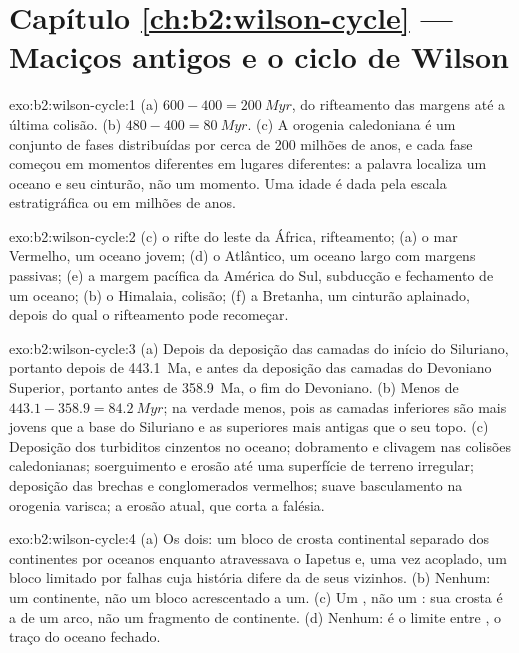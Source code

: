 \section*{Capítulo \ref{ch:b2:wilson-cycle} --- Maciços antigos e o ciclo de Wilson}

\begin{solution}{exo:b2:wilson-cycle:1}
(a) $600 - 400 = \qty{200}{Myr}$, do rifteamento das margens até a última colisão.
(b) $480 - 400 = \qty{80}{Myr}$. (c) A orogenia caledoniana é um conjunto de fases distribuídas por
cerca de 200 milhões de anos, e cada fase começou em momentos diferentes em lugares diferentes: a palavra
localiza um oceano e seu cinturão, não um momento. Uma idade é dada pela escala estratigráfica ou em
milhões de anos.
\end{solution}

\begin{solution}{exo:b2:wilson-cycle:2}
(c) o rifte do leste da África, rifteamento; (a) o mar Vermelho, um oceano jovem; (d) o Atlântico, um oceano
largo com margens passivas; (e) a margem pacífica da América do Sul, subducção e
fechamento de um oceano; (b) o Himalaia, colisão; (f) a Bretanha, um cinturão aplainado, depois do qual
o rifteamento pode recomeçar.
\end{solution}

\begin{solution}{exo:b2:wilson-cycle:3}
(a) Depois da deposição das camadas do início do Siluriano, portanto depois de \qty{443.1}{Ma}, e antes da
deposição das camadas do Devoniano Superior, portanto antes de \qty{358.9}{Ma}, o fim do Devoniano.
(b) Menos de $443.1 - 358.9 = \qty{84.2}{Myr}$; na verdade menos, pois as camadas inferiores são mais jovens
que a base do Siluriano e as superiores mais antigas que o seu topo. (c) Deposição dos
turbiditos cinzentos no oceano; dobramento e clivagem nas colisões caledonianas; soerguimento e
erosão até uma superfície de terreno irregular; deposição das brechas e conglomerados vermelhos; suave
basculamento na orogenia varisca; a erosão atual, que corta a falésia.
\end{solution}

\begin{solution}{exo:b2:wilson-cycle:4}
(a) Os dois: um bloco de crosta continental separado dos continentes por oceanos enquanto
atravessava o Iapetus e, uma vez acoplado, um bloco limitado por falhas cuja história difere da de seus
vizinhos. (b) Nenhum: um continente, não um bloco acrescentado a um. (c) Um , não um
: sua crosta é a de um arco, não um fragmento de continente. (d) Nenhum: é
o limite entre , o traço do oceano fechado.
\end{solution}

